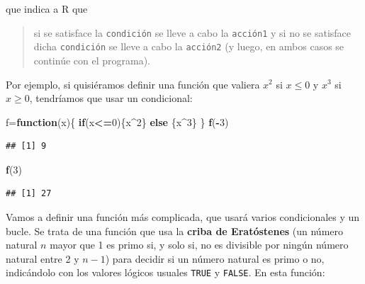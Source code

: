 \documentclass[]{book}
\newenvironment{Shaded}{\begin{snugshade}}{\end{snugshade}}
\newcommand{\ControlFlowTok}[1]{\textcolor[rgb]{0.13,0.29,0.53}{\textbf{#1}}}
\newcommand{\DecValTok}[1]{\textcolor[rgb]{0.00,0.00,0.81}{#1}}
\newcommand{\KeywordTok}[1]{\textcolor[rgb]{0.13,0.29,0.53}{\textbf{#1}}}
\newcommand{\NormalTok}[1]{#1}
\newcommand{\OperatorTok}[1]{\textcolor[rgb]{0.81,0.36,0.00}{\textbf{#1}}}
\theoremstyle{definition}
\theoremstyle{definition}
\theoremstyle{definition}
\theoremstyle{remark}
\begin{document}
que indica a R que

\begin{quote}
si se satisface la \texttt{condición} se lleve a cabo la \texttt{acción1} y si no se satisface dicha \texttt{condición} se lleve a cabo la \texttt{acción2} (y luego, en ambos casos se continúe con el programa).
\end{quote}

Por ejemplo, si quisiéramos definir una función que valiera \(x^2\) si \(x\leqslant 0\) y \(x^3\) si \(x\geqslant 0\), tendríamos que usar un condicional:

\begin{Shaded}
\begin{Highlighting}[]
\NormalTok{f=}\ControlFlowTok{function}\NormalTok{(x)\{}
  \ControlFlowTok{if}\NormalTok{(x}\OperatorTok{<=}\DecValTok{0}\NormalTok{)\{x}\OperatorTok{^}\DecValTok{2}\NormalTok{\} }\ControlFlowTok{else}\NormalTok{ \{x}\OperatorTok{^}\DecValTok{3}\NormalTok{\}}
\NormalTok{\}}
\KeywordTok{f}\NormalTok{(}\OperatorTok{-}\DecValTok{3}\NormalTok{)}
\end{Highlighting}
\end{Shaded}

\begin{verbatim}
## [1] 9
\end{verbatim}

\begin{Shaded}
\begin{Highlighting}[]
\KeywordTok{f}\NormalTok{(}\DecValTok{3}\NormalTok{)}
\end{Highlighting}
\end{Shaded}

\begin{verbatim}
## [1] 27
\end{verbatim}

Vamos a definir una función más complicada, que usará varios condicionales y un bucle. Se trata de una función que usa la \textbf{criba de Eratóstenes} (un número natural \(n\) mayor que 1 es primo si, y solo si, no es divisible por ningún número natural entre 2 y \(n-1\)) para decidir si un número natural es primo o no, indicándolo con los valores lógicos usuales \texttt{TRUE} y \texttt{FALSE}. En esta función:
\end{document}
